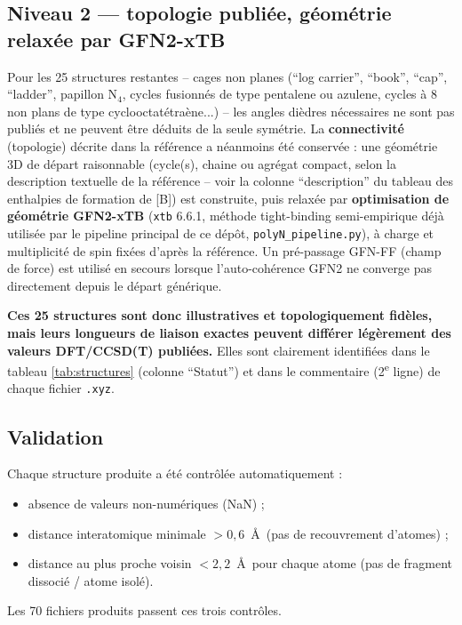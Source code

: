 \documentclass[11pt,a4paper]{article}
\begin{document}
\subsection{Niveau 2 --- topologie publi\'ee, g\'eom\'etrie relax\'ee par GFN2-xTB}
\label{sec:niveau2}

Pour les 25 structures restantes -- cages non planes (``log carrier'',
``book'', ``cap'', ``ladder'', papillon N$_4$, cycles fusionn\'es de type
pentalene ou azulene, cycles \`a 8 non plans de type
cyclooctat\'etra\`ene...) -- les angles di\`edres n\'ecessaires ne sont pas
publi\'es et ne peuvent \^etre d\'eduits de la seule sym\'etrie. La
\textbf{connectivit\'e} (topologie) d\'ecrite dans la r\'ef\'erence a
n\'eanmoins \'et\'e conserv\'ee : une g\'eom\'etrie 3D de d\'epart
raisonnable (cycle(s), chaine ou agr\'egat compact, selon la description
textuelle de la r\'ef\'erence -- voir la colonne ``description'' du tableau
des enthalpies de formation de [B]) est construite, puis relax\'ee par
\textbf{optimisation de g\'eom\'etrie GFN2-xTB} (\texttt{xtb} 6.6.1,
m\'ethode tight-binding semi-empirique d\'ej\`a utilis\'ee par le pipeline
principal de ce d\'ep\^ot, \texttt{polyN\_pipeline.py}), \`a charge et
multiplicit\'e de spin fix\'ees d'apr\`es la r\'ef\'erence. Un pr\'e-passage
GFN-FF (champ de force) est utilis\'e en secours lorsque l'auto-coh\'erence
GFN2 ne converge pas directement depuis le d\'epart g\'en\'erique.

\textbf{Ces 25 structures sont donc illustratives et topologiquement
fid\`eles, mais leurs longueurs de liaison exactes peuvent diff\'erer
l\'eg\`erement des valeurs DFT/CCSD(T) publi\'ees.} Elles sont clairement
identifi\'ees dans le tableau \ref{tab:structures} (colonne ``Statut'') et
dans le commentaire (2\textsuperscript{e} ligne) de chaque fichier \texttt{.xyz}.

\subsection{Validation}

Chaque structure produite a \'et\'e contr\^ol\'ee automatiquement :
\begin{itemize}
  \item absence de valeurs non-num\'eriques (NaN) ;
  \item distance interatomique minimale $> 0{,}6$~\AA\ (pas de recouvrement
  d'atomes) ;
  \item distance au plus proche voisin $< 2{,}2$~\AA\ pour chaque atome
  (pas de fragment dissoci\'e / atome isol\'e).
\end{itemize}
Les 70 fichiers produits passent ces trois contr\^oles.
\end{document}

